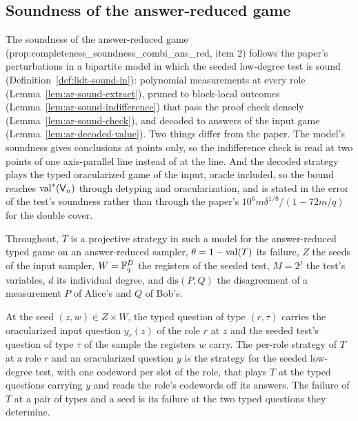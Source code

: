 \subsection{Soundness of the answer-reduced game}

The soundness of the answer-reduced game (prop:completeness\_soundness\_combi\_ans\_red, item 2)
follows the paper's perturbations in a bipartite model in which the seeded low-degree test is sound
(Definition~\ref{def:lidt-sound-in}): polynomial measurements at every role
(Lemma~\ref{lem:ar-sound-extract}), pruned to block-local outcomes
(Lemma~\ref{lem:ar-sound-indifference}) that pass the proof check densely
(Lemma~\ref{lem:ar-sound-check}), and decoded to answers of the input game
(Lemma~\ref{lem:ar-decoded-value}). Two things differ from the paper. The model's soundness gives
conclusions at points only, so the indifference check is read at two points of one axis-parallel
line instead of at the line. And the decoded strategy plays the typed oracularized game of the
input, oracle included, so the bound reaches $\mathrm{val}^*(\mathsf{V}_n)$ through detyping and
oracularization, and is stated in the error of the test's soundness rather than through the
paper's $10^6 m \delta^{1/8} / (1 - 72 m / q)$ for the double cover.

Throughout, $T$ is a projective strategy in such a model for the answer-reduced typed game on an
answer-reduced sampler, $\theta = 1 - \mathrm{val}(T)$ its failure, $Z$ the seeds of the input sampler,
$W = \mathbb{F}_q^{D}$ the registers of the seeded test, $M = 2^j$ the test's variables, $d$ its individual
degree, and $\mathrm{dis}(P, Q)$ the disagreement of a measurement $P$ of Alice's and $Q$ of
Bob's.

\begin{definition}
\label{def:ar-sound-roles}
\leanok
At the seed $(z, w) \in Z \times W$, the typed question of type $(r, \tau)$ carries the
oracularized input question $y_r(z)$ of the role $r$ at $z$ and the seeded test's question of type
$\tau$ of the sample the registers $w$ carry. The per-role strategy of $T$ at a role $r$ and an
oracularized question $y$ is the strategy for the seeded low-degree test, with one codeword per
slot of the role, that plays $T$ at the typed questions carrying $y$ and reads the role's
codewords off its answers. The failure of $T$ at a pair of types and a seed is its failure at the
two typed questions they determine.
\end{definition}

